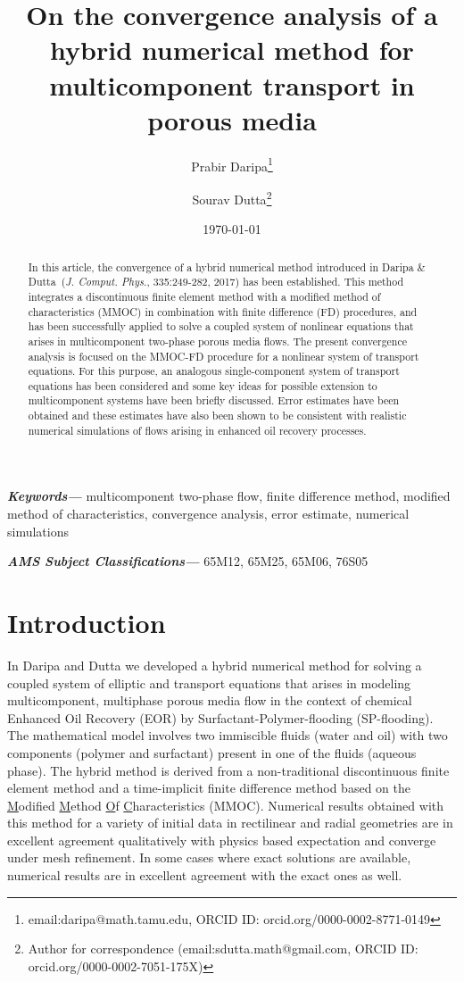 \documentclass[11pt]{article}
\title{On the convergence analysis of a hybrid numerical method for multicomponent transport in porous media}
\date{\today}
\author[1]{Prabir Daripa\thanks{email:daripa@math.tamu.edu, ORCID ID: orcid.org/0000-0002-8771-0149}}
\author[2]{Sourav Dutta\thanks{Author for correspondence  (email:sdutta.math@gmail.com, ORCID ID: orcid.org/0000-0002-7051-175X)}}
\affil[1]{\scriptsize{Department of Mathematics, Texas A\&M University, 3368 TAMU, College Station, TX 77843, USA} }
\affil[2]{{\scriptsize U.S. Army Engineer Research and Development Center, Coastal and Hydraulics Laboratory (ERDC-CHL), Vicksburg, MS 39180, USA}}
\newcommand{\ul}{\underline}
\providecommand{\keywords}[1]{\textbf{\textit{Keywords---}} #1}
\providecommand{\msc}[1]{\textbf{\textit{AMS Subject Classifications---}} #1}
\begin{document}
\thispagestyle{fancy}
\maketitle

\begin{abstract}
	In this article, the convergence of a hybrid numerical method introduced in Daripa \& Dutta~({\sl J. Comput. Phys.}, 335:249-282, 2017) has been established. This method integrates a discontinuous finite element method with a modified method of characteristics (MMOC) in combination with finite difference (FD) procedures, and has been successfully applied to solve a coupled system of nonlinear equations that arises in multicomponent two-phase porous media flows. The present convergence analysis is focused on the MMOC-FD procedure for a nonlinear system of transport equations. For this purpose, an analogous single-component system of transport equations has been considered and some key ideas for possible extension to multicomponent systems have been briefly discussed. Error estimates have been obtained and these estimates have also been shown to be consistent with realistic numerical simulations of flows arising in enhanced oil recovery processes.
\end{abstract}


\keywords{multicomponent two-phase flow, finite difference method, modified method of characteristics, convergence analysis, error estimate, numerical simulations}

\smallskip

\msc{65M12, 65M25, 65M06, 76S05}


\section{Introduction}
In Daripa and Dutta \cite{DD2017} we developed a hybrid numerical method for solving a coupled system of elliptic and transport equations that arises in modeling multicomponent, multiphase porous media flow in the context of chemical Enhanced Oil Recovery (EOR) by Surfactant-Polymer-flooding (SP-flooding). The mathematical model involves two immiscible fluids (water and oil) with two components (polymer and surfactant) present in one of the fluids (aqueous phase). The hybrid method is derived from a non-traditional discontinuous finite element method and a time-implicit finite difference method based on the \ul{M}odified \ul{M}ethod \ul{O}f \ul{C}haracteristics (MMOC). Numerical results obtained with this method for a variety of initial data in rectilinear and radial geometries are in excellent agreement qualitatively with physics based expectation and converge under mesh refinement. In some cases where exact solutions are available, numerical results are in excellent agreement with the exact ones as well. 
\end{document}
